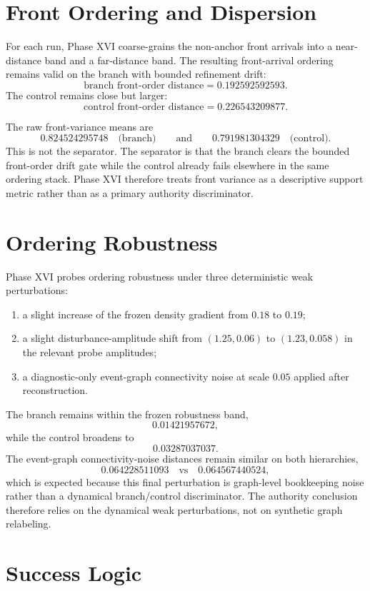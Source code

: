 \documentclass[11pt]{article}
\begin{document}
\section{Front Ordering and Dispersion}

For each run, Phase XVI coarse-grains the non-anchor front arrivals into a near-distance band and a far-distance band. The resulting front-arrival ordering remains valid on the branch with bounded refinement drift:
\[
\text{branch front-order distance} = 0.192592592593.
\]
The control remains close but larger:
\[
\text{control front-order distance} = 0.226543209877.
\]

The raw front-variance means are
\[
0.824524295748
\quad\text{(branch)}
\qquad\text{and}\qquad
0.791981304329
\quad\text{(control)}.
\]
This is not the separator. The separator is that the branch clears the bounded front-order drift gate while the control already fails elsewhere in the same ordering stack. Phase XVI therefore treats front variance as a descriptive support metric rather than as a primary authority discriminator.

\section{Ordering Robustness}

Phase XVI probes ordering robustness under three deterministic weak perturbations:
\begin{enumerate}
\item a slight increase of the frozen density gradient from $0.18$ to $0.19$;
\item a slight disturbance-amplitude shift from $(1.25,0.06)$ to $(1.23,0.058)$ in the relevant probe amplitudes;
\item a diagnostic-only event-graph connectivity noise at scale $0.05$ applied after reconstruction.
\end{enumerate}

The branch remains within the frozen robustness band,
\[
0.01421957672,
\]
while the control broadens to
\[
0.03287037037.
\]
The event-graph connectivity-noise distances remain similar on both hierarchies,
\[
0.064228511093
\quad\text{vs}\quad
0.064567440524,
\]
which is expected because this final perturbation is graph-level bookkeeping noise rather than a dynamical branch/control discriminator. The authority conclusion therefore relies on the dynamical weak perturbations, not on synthetic graph relabeling.

\section{Success Logic}
\end{document}
